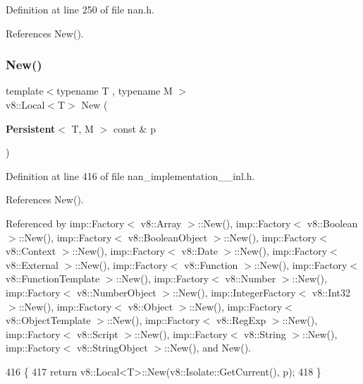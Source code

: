 Definition at line 250 of file nan.\+h.



References New().

\mbox{\label{nan__new_8h_a4c6a402f49f0cb9574fa28e93691c423}} 
\subsubsection{New()\hspace{0.1cm}{\footnotesize\ttfamily [9/22]}}
{\footnotesize\ttfamily template$<$typename T , typename M $>$ \\
v8\+::\+Local$<$T$>$ New (\begin{DoxyParamCaption}\item[{\textbf{ Persistent}$<$ T, M $>$ const \&}]{p }\end{DoxyParamCaption})}



Definition at line 416 of file nan\+\_\+implementation\+\_\+\_\+inl.\+h.



References New().



Referenced by imp\+::\+Factory$<$ v8\+::\+Array $>$\+::\+New(), imp\+::\+Factory$<$ v8\+::\+Boolean $>$\+::\+New(), imp\+::\+Factory$<$ v8\+::\+Boolean\+Object $>$\+::\+New(), imp\+::\+Factory$<$ v8\+::\+Context $>$\+::\+New(), imp\+::\+Factory$<$ v8\+::\+Date $>$\+::\+New(), imp\+::\+Factory$<$ v8\+::\+External $>$\+::\+New(), imp\+::\+Factory$<$ v8\+::\+Function $>$\+::\+New(), imp\+::\+Factory$<$ v8\+::\+Function\+Template $>$\+::\+New(), imp\+::\+Factory$<$ v8\+::\+Number $>$\+::\+New(), imp\+::\+Factory$<$ v8\+::\+Number\+Object $>$\+::\+New(), imp\+::\+Integer\+Factory$<$ v8\+::\+Int32 $>$\+::\+New(), imp\+::\+Factory$<$ v8\+::\+Object $>$\+::\+New(), imp\+::\+Factory$<$ v8\+::\+Object\+Template $>$\+::\+New(), imp\+::\+Factory$<$ v8\+::\+Reg\+Exp $>$\+::\+New(), imp\+::\+Factory$<$ v8\+::\+Script $>$\+::\+New(), imp\+::\+Factory$<$ v8\+::\+String $>$\+::\+New(), imp\+::\+Factory$<$ v8\+::\+String\+Object $>$\+::\+New(), and New().


\begin{DoxyCode}
416                                                    \{
417   \textcolor{keywordflow}{return} v8::Local<T>::New(v8::Isolate::GetCurrent(), p);
418 \}
\end{DoxyCode}
\mbox{\label{nan__new_8h_a2c93beb386312e1982816de2fede732f}} 
